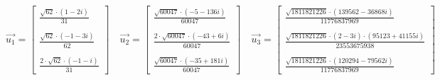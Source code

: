 \documentclass{article}
\begin{document}
            \[
                \vec{u_1} = \begin{bmatrix}
                \displaystyle \frac{\sqrt{62} \cdot (1 - 2i)}{31} \\
                \\
                \displaystyle \frac{\sqrt{62} \cdot (-1 - 3i)}{62} \\
                \\
                \displaystyle \frac{2 \cdot \sqrt{62} \cdot (-1 - i)}{31}
                \end{bmatrix}
                \quad
                \vec{u_2} = \begin{bmatrix}
                \displaystyle \frac{\sqrt{60047} \cdot (-5 - 136i)}{60047} \\
                \\
                \displaystyle \frac{2 \cdot \sqrt{60047} \cdot (-43 + 6i)}{60047} \\
                \\
                \displaystyle \frac{\sqrt{60047} \cdot (-35 + 181i)}{60047}
                \end{bmatrix}
                \quad
                \vec{u_3} = \begin{bmatrix}
                \displaystyle \frac{\sqrt{1811821226} \cdot (139562 - 36868i)}{11776837969} \\
                \\
                \displaystyle \frac{\sqrt{1811821226} \cdot (2 - 3i) \cdot (95123 + 41155i)}{23553675938} \\
                \\
                \displaystyle \frac{\sqrt{1811821226} \cdot (120294 - 79562i)}{11776837969}
                \end{bmatrix}
            \]

            
\end{document}

